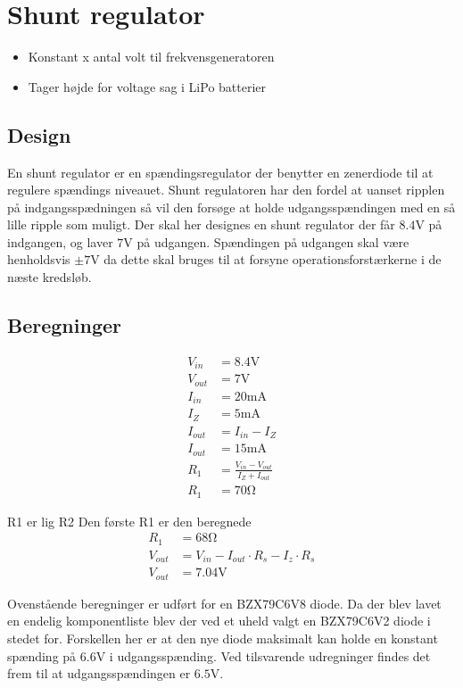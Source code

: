 \section{Shunt regulator}\label{sec:shunt}



\begin{itemize}
	\item Konstant x antal volt til frekvensgeneratoren
	\item Tager højde for voltage sag i LiPo batterier
\end{itemize}


\subsection{Design}
En shunt regulator er en spændingsregulator der benytter en zenerdiode til at regulere spændings niveauet.
Shunt regulatoren har den fordel at uanset ripplen på indgangsspædningen så vil den forsøge at holde udgangsspændingen med en så lille ripple som muligt.
Der skal her designes en shunt regulator der får $8.4 \si{\volt}$ på indgangen, og laver $7 \si{\volt}$ på udgangen.
Spændingen på udgangen skal være henholdsvis $\pm 7 \si{\volt}$ da dette skal bruges til at forsyne operationsforstærkerne i de næste kredsløb.

\subsection{Beregninger}


\begin{align}
	V_{in} & = 8.4 \si{\volt} \nonumber \\
	V_{out} & = 7 \si{\volt} \nonumber \\
	I_{in} & = 20\si{\milli\ampere} \nonumber \\
	I_Z & = 5 \si{\milli\ampere} \nonumber \\
	I_{out} & = I_{in} - I_Z \\
	I_{out} & = 15 \si{\milli\ampere} \nonumber \\
	R_1 & = \frac{V_{in} - V_{out}}{I_Z + I_{out}} \label{eq:RegulatorModstand} \\
	R_1 & = 70 \si{\ohm} \nonumber \label{eq:RegulatorModstandBeregnet}
\end{align}

R1 er lig R2
Den første R1 er den beregnede
\begin{align}
	R_1 & = 68 \si{\ohm} \nonumber \\
	V_{out} & = V_{in} - I_{out} \cdot R_s - I_z \cdot R_s \\
	V_{out} & = 7.04 \si{\volt} \label{eq:RegulatorBeregnetPotentiale} 
\end{align}

Ovenstående beregninger er udført for en BZX79C6V8 diode. 
Da der blev lavet en endelig komponentliste blev der ved et uheld valgt en BZX79C6V2 diode i stedet for. 
Forskellen her er at den nye diode maksimalt kan holde en konstant spænding på $6.6 \si{\volt}$ i udgangsspænding.
Ved tilsvarende udregninger findes det frem til at udgangsspændingen er $6.5 \si{\volt}$.